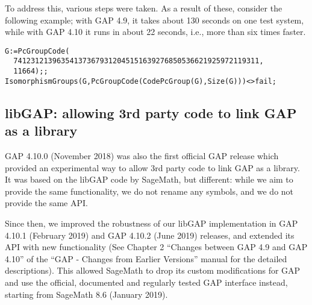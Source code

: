 \documentclass{deliverablereport}
\begin{document}
To address this, various steps were taken.
As a result of these, consider the following 
example; with GAP 4.9, it takes about 130 seconds on one test system, 
while with GAP 4.10 it runs in about 22 seconds, i.e., more than six times faster.

{\small
\begin{verbatim}
G:=PcGroupCode( 
  741231213963541373679312045151639276850536621925972119311,
  11664);;
IsomorphismGroups(G,PcGroupCode(CodePcGroup(G),Size(G)))<>fail;
\end{verbatim}
}


%
%


\subsection{libGAP: allowing 3rd party code to link GAP as a library}

GAP 4.10.0 (November 2018) was also the first official GAP release
which provided an experimental way to allow 3rd party code to 
link GAP as a library. It was based on the libGAP code by SageMath, 
but different: while we aim to provide the same functionality, 
we do not rename any symbols, and we do not provide the same API. 

Since then, we improved the robustness of our libGAP implementation
in GAP 4.10.1 (February 2019) and GAP 4.10.2 (June 2019) releases,
and extended its API with new functionality (See Chapter 2 
``Changes between GAP 4.9 and GAP 4.10'' of the 
``GAP - Changes from Earlier Versions'' manual for the detailed
descriptions). This allowed SageMath to drop its custom 
modifications for GAP and use the official, documented and regularly 
tested GAP interface instead, starting from SageMath 8.6 (January 2019).
\end{document}
